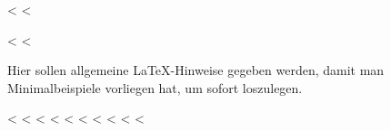 \documentclass[ngerman,runningheads,a4paper]{llncs}[2018/03/10]
\begin{document}
<%
<%
\label{chap:latexhints}

<%
\newcount\LTGbeginlineexample
\newcount\LTGendlineexample
\newenvironment{ltgexample}%
{\LTGbeginlineexample=\numexpr\inputlineno+1\relax}%
{%
\LTGendlineexample=\numexpr\inputlineno-1\relax%

\tcbinputlisting{%
  listing only,
  listing file=\currfilepath,
  colback=green!5!white,
  colframe=green!25,
  coltitle=black!90,
  coltext=black!90,
  left=8mm,
  title=Zugehöriger \LaTeX{}-Quelltext aus \texttt{\currfilepath},
  listing options={%
    frame=none,
    language={[LaTeX]TeX},
    firstline=\the\LTGbeginlineexample,
    lastline=\the\LTGendlineexample,
    firstnumber=\the\LTGbeginlineexample,
    basewidth=.5em,
    aboveskip=0mm,
    belowskip=0mm,
    numbers=left,
    xleftmargin=0mm,
    numberstyle=\tiny,
    numbersep=8pt%
  }
}
}%
<%

Hier sollen allgemeine \LaTeX-Hinweise gegeben werden, damit man Minimalbeispiele vorliegen hat, um sofort loszulegen.

<%
<%
<%
<%
<%
<%
<%
<%
<%
<%
\end{document}
